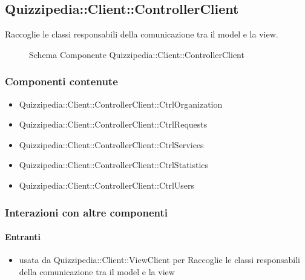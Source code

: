 \subsection{Quizzipedia::Client::ControllerClient}
Raccoglie le classi responsabili della comunicazione tra il model e la view.
\begin{figure}[H]
\centering
\noindent{}
\caption[Schema Componente Quizzipedia::Client::ControllerClient]{Schema Componente Quizzipedia::Client::ControllerClient}
\end{figure}
\subsubsection{Componenti contenute}
\begin{itemize}
\item Quizzipedia::Client::ControllerClient::CtrlOrganization
\item Quizzipedia::Client::ControllerClient::CtrlRequests
\item Quizzipedia::Client::ControllerClient::CtrlServices
\item Quizzipedia::Client::ControllerClient::CtrlStatistics
\item Quizzipedia::Client::ControllerClient::CtrlUsers
\end{itemize}
\subsubsection{Interazioni con altre componenti}
\paragraph{Entranti}
\begin{itemize}
\item usata da Quizzipedia::Client::ViewClient per Raccoglie le classi responsabili della comunicazione tra il model e la view
\end{itemize}
